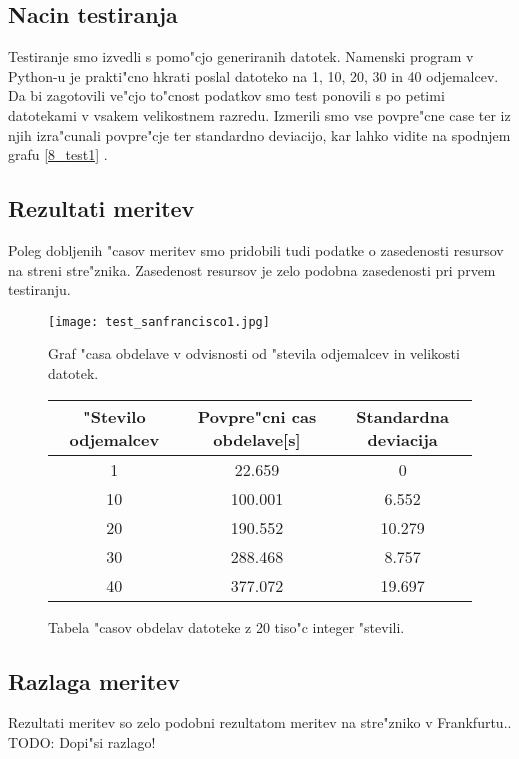 \subsection{Nacin testiranja}
Testiranje smo izvedli s pomo"cjo generiranih datotek. Namenski program v Python-u je prakti"cno hkrati poslal datoteko na 1, 10, 20, 30 in 40 odjemalcev. Da bi zagotovili ve"cjo to"cnost podatkov smo test ponovili s po petimi datotekami v vsakem velikostnem razredu. 
Izmerili smo vse povpre"cne case ter iz njih izra"cunali povpre"cje ter standardno deviacijo, kar lahko vidite na spodnjem grafu  \ref{8_test1} . 

\subsection{Rezultati meritev}
Poleg dobljenih "casov meritev smo pridobili tudi podatke o zasedenosti resursov na streni stre"znika. Zasedenost resursov je zelo podobna zasedenosti pri prvem testiranju. 


\begin{figure}
  \centering
    \texttt{[image: test\_sanfrancisco1.jpg]}
  \caption{Graf "casa obdelave v odvisnosti od "stevila odjemalcev in velikosti datotek.}
  \label{8_graph_sanfrancisco1}
\end{figure}



\begin{figure}[!htbp]
  \centering
  \begin{tabular}{ | c | c | c | }
    \hline
    "Stevilo odjemalcev & Povpre"cni cas obdelave[s] & Standardna deviacija\\ \hline
    1 & 22.659     & 0 \\ \hline
    10 & 100.001 & 6.552\\ \hline
    20 & 190.552 & 10.279\\ \hline
    30 & 288.468 & 8.757\\ \hline
    40 & 377.072 & 19.697\\ \hline
  \end{tabular}
  \caption{Tabela "casov obdelav datoteke z 20 tiso"c integer "stevili.}
  \label{8_table_sanfrancisco1}
  \centering
\end{figure}


\subsection{Razlaga meritev}
Rezultati meritev so zelo podobni rezultatom meritev na stre"zniko v Frankfurtu..
TODO: Dopi"si razlago!


